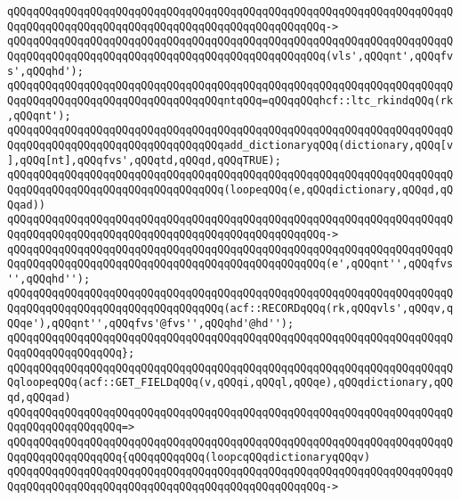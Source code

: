\verb|qQQqqQQqqQQqqQQqqQQqqQQqqQQqqQQqqQQqqQQqqQQqqQQqqQQqqQQqqQQqqQQqqQQqqQQqqQQqqQQqqQQqqQQqqQQqqQQqqQQqqQQqqQQqqQQqqQQqqQQq->|\newline
\verb|qQQqqQQqqQQqqQQqqQQqqQQqqQQqqQQqqQQqqQQqqQQqqQQqqQQqqQQqqQQqqQQqqQQqqQQqqQQqqQQqqQQqqQQqqQQqqQQqqQQqqQQqqQQqqQQqqQQqqQQq(vls',qQQqnt',qQQqfvs',qQQqhd');|\newline
\newline
\verb|qQQqqQQqqQQqqQQqqQQqqQQqqQQqqQQqqQQqqQQqqQQqqQQqqQQqqQQqqQQqqQQqqQQqqQQqqQQqqQQqqQQqqQQqqQQqqQQqqQQqqQQqntqQQq=qQQqqQQqhcf::ltc_rkindqQQq(rk,qQQqnt');|\newline
\newline
\verb|qQQqqQQqqQQqqQQqqQQqqQQqqQQqqQQqqQQqqQQqqQQqqQQqqQQqqQQqqQQqqQQqqQQqqQQqqQQqqQQqqQQqqQQqqQQqqQQqqQQqqQQqadd_dictionaryqQQq(dictionary,qQQq[v],qQQq[nt],qQQqfvs',qQQqtd,qQQqd,qQQqTRUE);|\newline
\newline
\verb|qQQqqQQqqQQqqQQqqQQqqQQqqQQqqQQqqQQqqQQqqQQqqQQqqQQqqQQqqQQqqQQqqQQqqQQqqQQqqQQqqQQqqQQqqQQqqQQqqQQqqQQq(loopeqQQq(e,qQQqdictionary,qQQqd,qQQqad))|\newline
\verb|qQQqqQQqqQQqqQQqqQQqqQQqqQQqqQQqqQQqqQQqqQQqqQQqqQQqqQQqqQQqqQQqqQQqqQQqqQQqqQQqqQQqqQQqqQQqqQQqqQQqqQQqqQQqqQQqqQQqqQQq->|\newline
\verb|qQQqqQQqqQQqqQQqqQQqqQQqqQQqqQQqqQQqqQQqqQQqqQQqqQQqqQQqqQQqqQQqqQQqqQQqqQQqqQQqqQQqqQQqqQQqqQQqqQQqqQQqqQQqqQQqqQQqqQQq(e',qQQqnt'',qQQqfvs'',qQQqhd'');|\newline
\newline
\verb|qQQqqQQqqQQqqQQqqQQqqQQqqQQqqQQqqQQqqQQqqQQqqQQqqQQqqQQqqQQqqQQqqQQqqQQqqQQqqQQqqQQqqQQqqQQqqQQqqQQqqQQq(acf::RECORDqQQq(rk,qQQqvls',qQQqv,qQQqe'),qQQqnt'',qQQqfvs'@fvs'',qQQqhd'@hd'');|\newline
\verb|qQQqqQQqqQQqqQQqqQQqqQQqqQQqqQQqqQQqqQQqqQQqqQQqqQQqqQQqqQQqqQQqqQQqqQQqqQQqqQQqqQQqqQQq};|\newline
\newline
\verb|qQQqqQQqqQQqqQQqqQQqqQQqqQQqqQQqqQQqqQQqqQQqqQQqqQQqqQQqqQQqqQQqqQQqqQQqloopeqQQq(acf::GET_FIELDqQQq(v,qQQqi,qQQql,qQQqe),qQQqdictionary,qQQqd,qQQqad)|\newline
\verb|qQQqqQQqqQQqqQQqqQQqqQQqqQQqqQQqqQQqqQQqqQQqqQQqqQQqqQQqqQQqqQQqqQQqqQQqqQQqqQQqqQQqqQQq=>|\newline
\verb|qQQqqQQqqQQqqQQqqQQqqQQqqQQqqQQqqQQqqQQqqQQqqQQqqQQqqQQqqQQqqQQqqQQqqQQqqQQqqQQqqQQqqQQq{qQQqqQQqqQQq(loopcqQQqdictionaryqQQqv)|\newline
\verb|qQQqqQQqqQQqqQQqqQQqqQQqqQQqqQQqqQQqqQQqqQQqqQQqqQQqqQQqqQQqqQQqqQQqqQQqqQQqqQQqqQQqqQQqqQQqqQQqqQQqqQQqqQQqqQQqqQQqqQQq->|\newline
